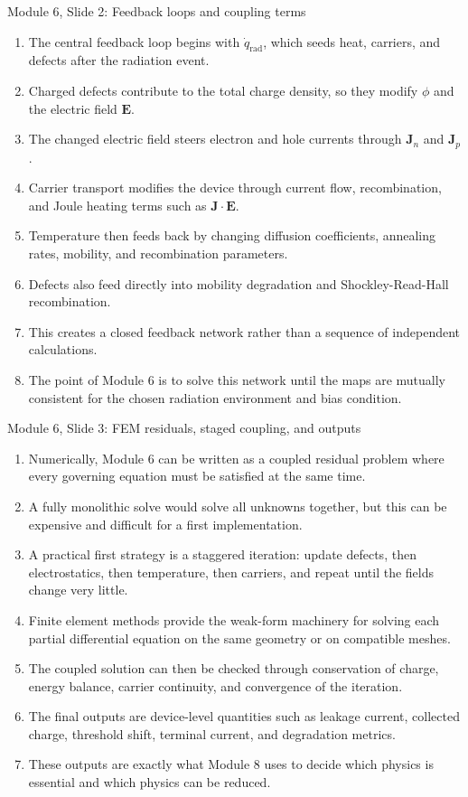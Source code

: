 \documentclass[11pt]{article}
\newcommand{\qrad}{\dot{q}_{\mathrm{rad}}}
\newcommand{\Evec}{\bm{E}}
\newcommand{\Jvec}{\bm{J}}
\newcommand{\Jn}{\bm{J}_n}
\newcommand{\Jp}{\bm{J}_p}
\begin{document}
\begin{slidebox}{Module 6, Slide 2: Feedback loops and coupling terms}
\begin{enumerate}
\item The central feedback loop begins with \(\qrad\), which seeds heat, carriers, and defects after the radiation event.
\item Charged defects contribute to the total charge density, so they modify \(\phi\) and the electric field \(\Evec\).
\item The changed electric field steers electron and hole currents through \(\Jn\) and \(\Jp\).
\item Carrier transport modifies the device through current flow, recombination, and Joule heating terms such as \(\Jvec\cdot\Evec\).
\item Temperature then feeds back by changing diffusion coefficients, annealing rates, mobility, and recombination parameters.
\item Defects also feed directly into mobility degradation and Shockley-Read-Hall recombination.
\item This creates a closed feedback network rather than a sequence of independent calculations.
\item The point of Module 6 is to solve this network until the maps are mutually consistent for the chosen radiation environment and bias condition.
\end{enumerate}
\end{slidebox}

\begin{slidebox}{Module 6, Slide 3: FEM residuals, staged coupling, and outputs}
\begin{enumerate}
\item Numerically, Module 6 can be written as a coupled residual problem where every governing equation must be satisfied at the same time.
\item A fully monolithic solve would solve all unknowns together, but this can be expensive and difficult for a first implementation.
\item A practical first strategy is a staggered iteration: update defects, then electrostatics, then temperature, then carriers, and repeat until the fields change very little.
\item Finite element methods provide the weak-form machinery for solving each partial differential equation on the same geometry or on compatible meshes.
\item The coupled solution can then be checked through conservation of charge, energy balance, carrier continuity, and convergence of the iteration.
\item The final outputs are device-level quantities such as leakage current, collected charge, threshold shift, terminal current, and degradation metrics.
\item These outputs are exactly what Module 8 uses to decide which physics is essential and which physics can be reduced.
\end{enumerate}
\end{slidebox}
\end{document}

